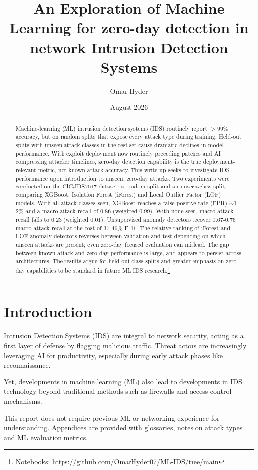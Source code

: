 \documentclass{article}
\title{An Exploration of Machine Learning for zero-day detection in network Intrusion Detection Systems}
\author{Omar Hyder}
\date{August 2026}
\begin{document}
\maketitle
\begin{abstract}
    Machine-learning (ML) intrusion detection systems (IDS) routinely report $>99\%$ accuracy, but on random splits that expose every attack type during training. Held-out splits with unseen attack classes in the test set cause dramatic declines in model performance. With exploit deployment now routinely preceding patches and AI compressing attacker timelines\parencite{mandiant_mtrends2026}, zero-day detection capability is the true deployment-relevant metric, not known-attack accuracy. This write-up seeks to investigate IDS performance upon introduction to unseen, zero-day attacks. Two experiments were conducted on the CIC-IDS2017 dataset: a random split and an unseen-class split, comparing XGBoost, Isolation Forest (iForest) and Local Outlier Factor (LOF) models. With all attack classes seen, XGBoost reaches a false-positive rate (FPR) $\sim$1-2\% and a macro attack recall of 0.86 (weighted 0.99). With none seen, macro attack recall falls to 0.23 (weighted 0.01). Unsupervised anomaly detectors recover 0.67-0.76 macro attack recall at the cost of 37-46\% FPR. The relative ranking of iForest and LOF anomaly detectors reverses between validation and test depending on which unseen attacks are present; even zero-day focused evaluation can mislead. The gap between known-attack and zero-day performance is large, and appears to persist across architectures. The results argue for held-out class splits and greater emphasis on zero-day capabilities to be standard in future ML IDS research.\footnote{Notebooks: \url{https://github.com/OmarHyder07/ML-IDS/tree/main}}

\end{abstract}
\tableofcontents

\section{Introduction}
Intrusion Detection Systems (IDS) are integral to network security, acting as a first layer of defense by flagging malicious traffic. Threat actors are increasingly leveraging AI for productivity, especially during early attack phases like reconnaissance\parencite{mandiant_mtrends2026}. 
\par Yet, developments in machine learning (ML) also lead to developments in IDS technology beyond traditional methods such as firewalls and access control mechanisms\parencite{Hozouri2025}.
\par This report does not require previous ML or networking experience for understanding. Appendices are provided with glossaries, notes on attack types and ML evaluation metrics.
\end{document}
